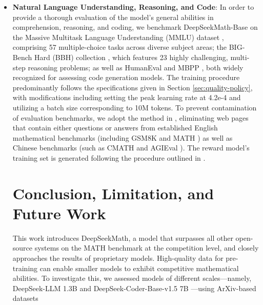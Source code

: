 {\begin{itemize}[topsep=0pt]
In this formulation, $\varepsilon$ and $\beta$ are hyper-parameters, and the advantage $\hat{A}_{i,t}$ is computed only with respect to the relative rewards of outputs within the sampled group, as will be elaborated upon in subsequent subsections. Within the RL context, this specifically refers to unlabeled questions along with their corresponding model-generated responses. Formally, for a given question $q$ and $G$ sampled completions $\{o_1, o_2, \cdots, o_G\}$, a process reward model produces scores for each reasoning stage, yielding $\mathbf{R} = \{ \{r_1^{index(1)},\cdots,r_1^{index(K_1)}\}, \cdots,  \{r_G^{index(1)},\cdots,r_G^{index(K_G)}\} \}$, with $index(j)$ denoting the terminal token of the $j$-th step, and $K_i$ the number of reasoning steps in output $o_i$. In our study, the reward function is divided into two types: `Rule' and `Model'. We draw $64$ samples for each prompt, set a maximum sequence length of 1024 tokens, and use a batch size of 1024 during training. Additionally, we outline a cohesive framework for interpreting various reinforcement learning approaches and identify several promising research directions for improving RL efficacy. Uncollected web pages associated with these URLs are then incorporated into the seed corpus. \item \textbf{Natural Language Understanding, Reasoning, and Code}: In order to provide a thorough evaluation of the model’s general abilities in comprehension, reasoning, and coding, we benchmark DeepSeekMath-Base on the Massive Multitask Language Understanding (MMLU) dataset \citep{mmlu}, comprising 57 multiple-choice tasks across diverse subject areas; the BIG-Bench Hard (BBH) collection \citep{bbh}, which features 23 highly challenging, multi-step reasoning problems; as well as HumanEval \citep{codex} and MBPP \citep{mbpp}, both widely recognized for assessing code generation models. The training procedure predominantly follows the specifications given in Section \ref{sec:quality-policy}, with modifications including setting the peak learning rate at 4.2e-4 and utilizing a batch size corresponding to 10M tokens. To prevent contamination of evaluation benchmarks, we adopt the method in \cite{deepseek-coder}, eliminating web pages that contain either questions or answers from established English mathematical benchmarks (including GSM8K \citep{gsm8k} and MATH \citep{MATH}) as well as Chinese benchmarks (such as CMATH \citep{wei2023cmath} and AGIEval \citep{agieval}). The reward model’s training set is generated following the procedure outlined in \citep{wang2023math}. \section{Conclusion, Limitation, and Future Work} This work introduces DeepSeekMath, a model that surpasses all other open-source systems on the MATH benchmark at the competition level, and closely approaches the results of proprietary models. High-quality data for pre-training can enable smaller models to exhibit competitive mathematical abilities. To investigate this, we assessed models of different scales—namely, DeepSeek-LLM 1.3B and DeepSeek-Coder-Base-v1.5 7B \citep{deepseek-coder}—using ArXiv-based datasets 
\end{itemize}}
